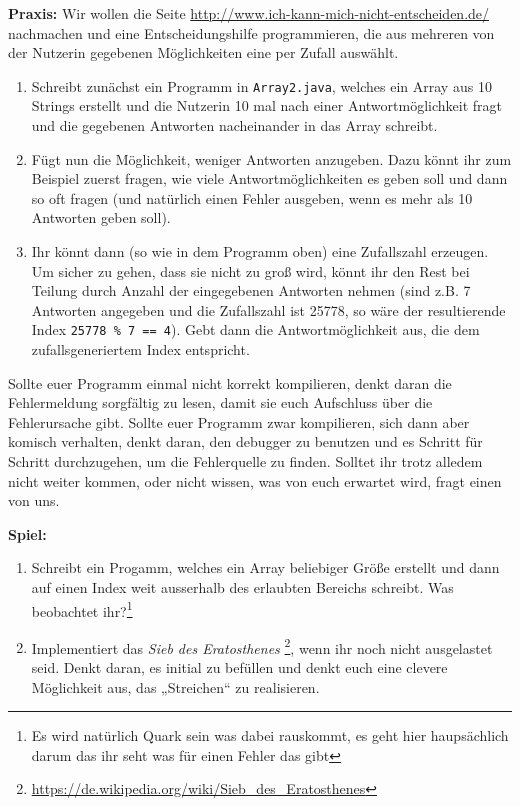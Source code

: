 \textbf{Praxis:}
Wir wollen die Seite \url{http://www.ich-kann-mich-nicht-entscheiden.de/}
nachmachen und eine Entscheidungshilfe programmieren, die aus mehreren von der
Nutzerin gegebenen Möglichkeiten eine per Zufall auswählt.

\begin{enumerate}
\item Schreibt zunächst ein Programm in \texttt{Array2.java}, welches ein Array
  aus 10 Strings erstellt und die Nutzerin 10 mal nach einer Antwortmöglichkeit
  fragt und die gegebenen Antworten nacheinander in das Array schreibt.
\item Fügt nun die Möglichkeit, weniger Antworten anzugeben. Dazu könnt ihr zum
  Beispiel zuerst fragen, wie viele Antwortmöglichkeiten es geben soll und dann
  so oft fragen (und natürlich einen Fehler ausgeben, wenn es mehr als 10
  Antworten geben soll).
\item Ihr könnt dann (so wie in dem Programm oben) eine Zufallszahl
  erzeugen. Um sicher zu gehen, dass sie nicht zu groß wird, könnt ihr
  den Rest bei Teilung durch Anzahl der eingegebenen Antworten nehmen
  (sind z.B. 7 Antworten angegeben und die Zufallszahl ist 25778, so wäre
  der resultierende Index \texttt{25778 \% 7 == 4}). Gebt dann die
  Antwortmöglichkeit aus, die dem zufallsgeneriertem Index
  entspricht.
\end{enumerate}

Sollte euer Programm einmal nicht korrekt kompilieren, denkt daran die
Fehlermeldung sorgfältig zu lesen, damit sie euch Aufschluss über die
Fehlerursache gibt. Sollte euer Programm zwar kompilieren, sich dann aber
komisch verhalten, denkt daran, den debugger zu benutzen und es Schritt für
Schritt durchzugehen, um die Fehlerquelle zu finden. Solltet ihr trotz alledem
nicht weiter kommen, oder nicht wissen, was von euch erwartet wird, fragt einen
von uns.

\textbf{Spiel:}
\begin{enumerate}
\item Schreibt ein Progamm, welches ein Array beliebiger Größe erstellt und
  dann auf einen Index weit ausserhalb des erlaubten Bereichs schreibt.
  Was beobachtet ihr?\footnote{Es wird natürlich Quark sein was dabei
		rauskommt, es geht hier haupsächlich darum das ihr seht was für
		einen Fehler das gibt}
\item Implementiert das \emph{Sieb des Eratosthenes}
  \footnote{\url{https://de.wikipedia.org/wiki/Sieb_des_Eratosthenes}},
  wenn ihr noch nicht ausgelastet seid.
  Denkt daran, es initial zu befüllen und denkt euch eine clevere
  Möglichkeit aus, das „Streichen“ zu realisieren.
\end{enumerate}
